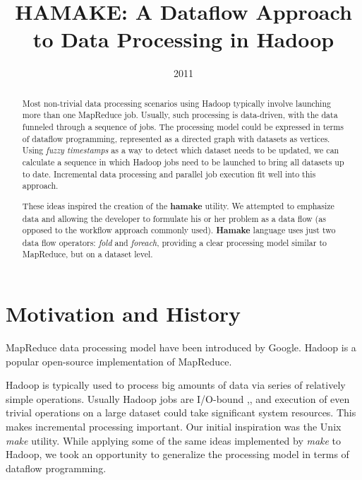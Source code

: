 \documentclass[10pt,conference,letterpaper]{IEEEtran}
\title{HAMAKE: A Dataflow Approach to Data Processing in Hadoop}
\author{\IEEEauthorblockN{Vadim Zaliva}
\IEEEauthorblockA{Codeminders\\
Email: lord@crocodile.org} \and \IEEEauthorblockN{Vladimir Orlov}
\IEEEauthorblockA{Codeminders\\
Email: vorl@codeminders.com}}
\date{2011}
\begin{document}
\lstset{language=XML,basicstyle=\tiny,markfirstintag=true,numbers=left,numbersep=1pt}

\maketitle

\begin{abstract}
  Most non-trivial data processing scenarios using Hadoop typically
  involve launching more than one MapReduce job. Usually, such
  processing is data-driven, with the data funneled through a sequence
  of jobs.  The processing model could be expressed in terms of
  dataflow programming, represented as a directed graph with datasets
  as vertices. Using \textit{fuzzy timestamps} as a way to detect
  which dataset needs to be updated, we can calculate a sequence in
  which Hadoop jobs need to be launched to bring all datasets up to
  date. Incremental data processing and parallel job execution fit
  well into this approach.

  These ideas inspired the creation of the \textbf{hamake} utility. We
  attempted to emphasize data and allowing the developer to formulate
  his or her problem as a data flow (as opposed to the workflow
  approach commonly used). \textbf{Hamake} language uses just two data
  flow operators: \emph{fold} and \emph{foreach}, providing a clear
  processing model similar to MapReduce, but on a dataset level.
\end{abstract}

\section{Motivation and History}

MapReduce data processing model have been introduced by
Google\cite{dean2008map}. Hadoop\cite{bialecki2005hadoop} is a popular
open-source implementation of MapReduce.

Hadoop is typically used to process big amounts of data via series of
relatively simple operations. Usually Hadoop jobs are I/O-bound
\cite{hadoopattwitter},\cite{hs2010hadoopbench}, and execution of even
trivial operations on a large dataset could take significant system
resources. This makes incremental processing important. Our initial
inspiration was the Unix \emph{make} utility. While applying some of the same ideas implemented by \emph{make}
to Hadoop, we took an opportunity to generalize the
processing model in terms of dataflow programming.
\end{document}
